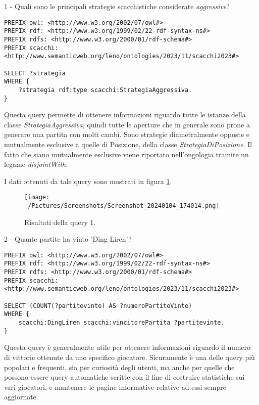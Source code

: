\documentclass[12pt]{book}
\begin{document}
1 - Quali sono le principali strategie scacchistiche considerate
\textit{aggressive}?

\begin{verbatim}
PREFIX owl: <http://www.w3.org/2002/07/owl#>
PREFIX rdf: <http://www.w3.org/1999/02/22-rdf-syntax-ns#>
PREFIX rdfs: <http://www.w3.org/2000/01/rdf-schema#>
PREFIX scacchi: <http://www.semanticweb.org/leno/ontologies/2023/11/scacchi2023#>

SELECT ?strategia
WHERE {
    ?strategia rdf:type scacchi:StrategiaAggressiva.
}
\end{verbatim}

Questa query permette di ottenere informazioni riguardo tutte le
istanze della classe \textit{StrategiaAggressiva}, quindi tutte le
aperture che in generale sono prone a generare una partita con molti
cambi. Sono strategie diametralmente opposte e mutualmente esclusive a
quelle di Posizione, della classe \textit{StrategiaDiPosizione}. Il
fatto che siano mutualmente esclusive viene riportato nell'ongologia
tramite un legame \textit{disjointWith}.

I dati ottenuti da tale query sono mostrati in figura \ref{fig:query1}.

\begin{figure}[h]
  \caption{Risultati della query 1.}
  \centering
  \label{fig:query1}
  \texttt{[image: ~/Pictures/Screenshots/Screenshot\_20240104\_174014.png]}
\end{figure} 

2 - Quante partite ha vinto 'Ding Liren'?

\begin{verbatim}
PREFIX owl: <http://www.w3.org/2002/07/owl#>
PREFIX rdf: <http://www.w3.org/1999/02/22-rdf-syntax-ns#>
PREFIX rdfs: <http://www.w3.org/2000/01/rdf-schema#>
PREFIX scacchi: <http://www.semanticweb.org/leno/ontologies/2023/11/scacchi2023#>

SELECT (COUNT(?partitevinte) AS ?numeroPartiteVinte)
WHERE {
    scacchi:DingLiren scacchi:vincitorePartita ?partitevinte.
}
\end{verbatim}

Questa query è generalmente utile per ottenere informazioni riguardo
il numero di vittorie ottenute da uno specifico giocatore. Sicuramente
è una delle query più popolari e frequenti, sia per curiosità degli
utenti, ma anche per quelle che possono essere query automatiche
scritte con il fine di costruire statistiche sui vari giocatori, e
mantenere le pagine informative relative ad essi sempre aggiornate.
\end{document}
